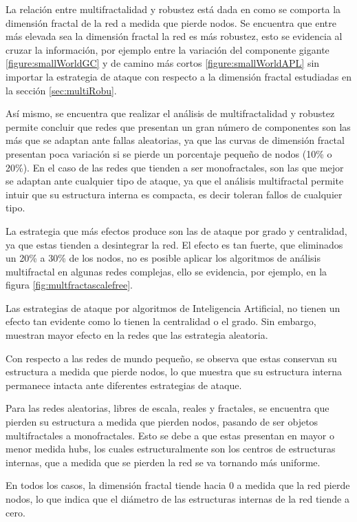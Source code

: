 La relación entre multifractalidad y robustez está dada en como se comporta la dimensión fractal de la red a medida que pierde nodos. Se encuentra que entre más elevada sea la dimensión fractal la red es más robustez, esto se evidencia al cruzar la información, por ejemplo entre la variación del componente gigante \ref{figure:smallWorldGC} y de camino más cortos \ref{figure:smallWorldAPL} sin importar la estrategia de ataque con respecto a la dimensión fractal estudiadas en la sección \ref{sec:multiRobu}.

Así mismo, se encuentra que realizar el análisis de multifractalidad y robustez permite concluir que redes que presentan un gran número de componentes son las más que se adaptan ante fallas aleatorias, ya que las curvas de dimensión fractal presentan poca variación si se pierde un porcentaje pequeño de nodos (10\% o 20\%). En el caso de las redes que tienden a ser monofractales, son las que mejor se adaptan ante cualquier tipo de ataque, ya que el análisis multifractal permite intuir que su estructura interna es compacta, es decir toleran fallos de cualquier tipo.

La estrategia que más efectos produce son las de ataque por grado y centralidad, ya que estas tienden a desintegrar la red. El efecto es tan fuerte, que eliminados un 20\% a 30\% de los nodos, no es posible aplicar los algoritmos de análisis multifractal en algunas redes complejas, ello se evidencia, por ejemplo, en la figura \ref{fig:multfractascalefree}.

Las estrategias de ataque por algoritmos de Inteligencia Artificial, no tienen un efecto tan evidente como lo tienen la centralidad o el grado. Sin embargo, muestran mayor efecto en la redes que las estrategia aleatoria.

Con respecto a las redes de mundo pequeño, se observa que estas conservan su estructura a medida que pierde nodos, lo que muestra que su estructura interna permanece intacta ante diferentes estrategias de ataque.

Para las redes aleatorias, libres de escala, reales y fractales, se encuentra que pierden su estructura a medida que pierden nodos, pasando de ser objetos multifractales a monofractales. Esto se debe a que estas presentan en mayor o menor medida hubs, los cuales estructuralmente son los centros de estructuras internas, que a medida que se pierden la red se va tornando más uniforme.

En todos los casos, la dimensión fractal tiende hacia 0 a medida que la red pierde nodos, lo que indica que el diámetro de las estructuras internas de la red tiende a cero.